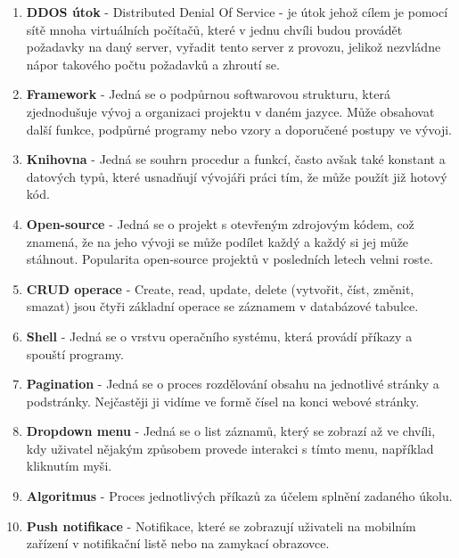 \documentclass[12pt,a4paper]{report}
\begin{document}
\begin{enumerate}
    \item \textbf{DDOS útok} - Distributed Denial Of Service - je útok jehož cílem je pomocí sítě mnoha virtuálních počítačů, které v jednu chvíli budou provádět požadavky na daný server, vyřadit tento server z provozu, jelikož nezvládne nápor takového počtu požadavků a zhroutí se.
    \item \textbf{Framework} - Jedná se o podpůrnou softwarovou strukturu, která zjednodušuje vývoj a organizaci projektu v daném jazyce. Může obsahovat další funkce, podpůrné programy nebo vzory a doporučené postupy ve vývoji.
    \item \textbf{Knihovna} - Jedná se souhrn procedur a funkcí, často avšak také konstant a datových typů, které usnadňují vývojáři práci tím, že může použít již hotový kód.
    \item \textbf{Open-source} - Jedná se o projekt s otevřeným zdrojovým kódem, což znamená, že na jeho vývoji se může podílet každý a každý si jej může stáhnout. Popularita open-source projektů v posledních letech velmi roste.
    \item \textbf{CRUD operace} - Create, read, update, delete (vytvořit, číst, změnit, smazat) jsou čtyři základní operace se záznamem v databázové tabulce.
    \item \textbf{Shell} - Jedná se o vrstvu operačního systému, která provádí příkazy a spouští programy.
    \item \textbf{Pagination} - Jedná se o proces rozdělování obsahu na jednotlivé stránky a podstránky. Nejčastěji ji vidíme ve formě čísel na konci webové stránky.
    \item \textbf{Dropdown menu} -  Jedná se o list záznamů, který se zobrazí až ve chvíli, kdy uživatel nějakým způsobem provede interakci s tímto menu, například kliknutím myši.
    \item \textbf{Algoritmus} - Proces jednotlivých příkazů za účelem splnění zadaného úkolu.
    \item \textbf{Push notifikace} - Notifikace, které se zobrazují uživateli na mobilním zařízení v notifikační listě nebo na zamykací obrazovce.
  \end{enumerate}
\end{document}
